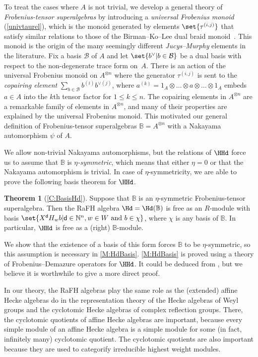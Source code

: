 \documentclass[a4paper,11pt]{amsart}
\newcommand\cB{\mathcal{B}}
\numberwithin{equation}{subsection}
\theoremstyle{definition}
\theoremstyle{theorem}
\newcounter{maintheorem}
\newtheorem{MainTheorem}[maintheorem]{Theorem}
\theoremstyle{remark}
\newcommand\Sym{W}
\newcommand\bd{\mathsf{d}}
\newcommand\N{\mathbb{N}}
\newcommand\RR{R}
\newcommand{\Bo}{\mathbb{B}}
\begin{document}
To treat the
cases where $A$ is not trivial, we develop a general theory of
\emph{Frobenius-tensor superalgebras} by introducing a \emph{universal
Frobenius monoid} (\autoref{univtaurel}), which is the monoid generated by
elements $\set{\tau^{(i,j)}}$ that satisfy similar relations to those of
the Birman--Ko--Lee dual braid monoid~\cite{BirmanKoLee}. This monoid
is the origin of the many seemingly different \emph{Jucys--Murphy}
elements in the literature. Fix a basis $\cB$ of $A$ and let
$\set{b^\vee|b\in\cB}$ be a dual basis with respect to the
non-degenerate trace form on~$A$. There is an action of the
universal Frobenius monoid on $A^{\otimes n}$ where the generator
$\tau^{(i,j)}$ is
sent to the \emph{copairing element} $\sum_{b\in\cB}b^{(i)}b^{\vee(j)}$,
where $a^{(k)}=1_A\otimes\dots\otimes a\otimes\dots\otimes 1_A$ embeds
$a\in A$ into the $k$th tensor factor for $1\le k\le n$. The copairing
elements in $A^{\otimes n}$ are a remarkable family of elements in
$A^{\otimes n}$, and many of their properties are explained by the
universal Frobenius monoid.  This motivated our general definition of Frobenius-tensor superalgebras $\Bo=A^{\otimes n}$ with a Nakayama automorphism $\psi$ of $A$.

We allow non-trivial Nakayama automorphisms, but the
relations of $\HHd$ force us to assume that $\Bo$ is
\emph{$\eta$-symmetric}, which means that either $\eta=0$ or that the Nakayama automorphism is trivial.
In case of $\eta$-symmetricity, we are able to prove the following
basis theorem for $\HHd$.

\begin{MainTheorem}[\autoref{C:BasisHd}]\label{M:HdBasis}
  Suppose that $\Bo$ is an $\eta$-symmetric Frobenius-tensor
  superalgebra. Then the RaFH algebra $\Hd=\Hd(\Bo)$ is free as an
  $\RR$-module with basis $\set{X^\bd H_w b|\bd\in\N^n, w\in\Sym\text{
  and }b\in\chi}$, where $\chi$ is any basis of $\Bo$.  In particular,
  $\HHd$ is free as a (right) $\Bo$-module.
\end{MainTheorem}

We show that the existence of a basis of this form forces $\Bo$ to be
$\eta$-symmetric, so this assumption is necessary in
\autoref{M:HdBasis}. \autoref{M:HdBasis} is proved using a theory of
Frobenius--Demazure operators for $\HHd$. It could be deduced from
\cite{CJNakanoXiang}, but we believe it is worthwhile to give a more direct proof.

In our theory, the RaFH algebras play the same role as the (extended)
affine Hecke algebras do in the representation theory of the Hecke algebras of
Weyl groups and the cyclotomic Hecke algebras of complex reflection
groups. There, the cyclotomic quotients of affine Hecke algebras are important,
because every simple module of an affine Hecke algebra is a simple
module for some (in fact, infinitely many) cyclotomic quotient. The
cyclotomic quotients are also important because they are used to categorify irreducible highest
weight modules.
\end{document}
